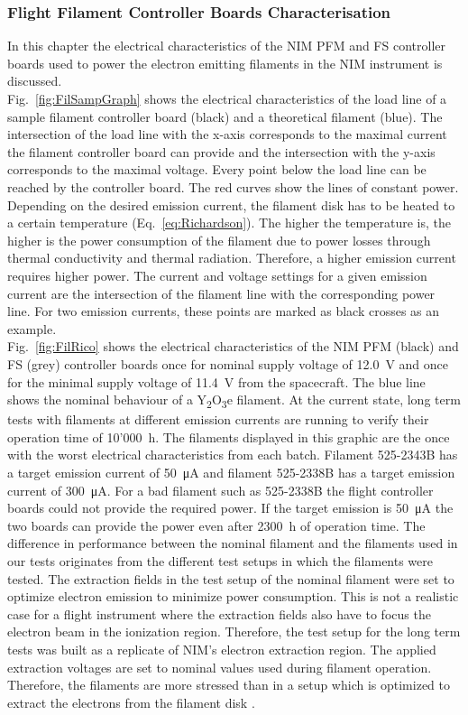 		\subsubsection{Flight Filament Controller Boards Characterisation}
		In this chapter the electrical characteristics of the NIM PFM and FS controller boards used to power the electron emitting filaments in the NIM instrument is discussed.\\
		Fig.~\ref{fig:FilSampGraph} shows the electrical characteristics of the load line of a sample filament controller board (black) and a theoretical filament (blue). The intersection of the load line with the x-axis corresponds to the maximal current the filament controller board can provide and the intersection with the y-axis corresponds to the maximal voltage. Every point below the load line can be reached by the controller board. The red curves show the lines of constant power. Depending on the desired emission current, the filament disk has to be heated to a certain temperature (Eq.~\eqref{eq:Richardson}). The higher the temperature is, the higher is the power consumption of the filament due to power losses through thermal conductivity and thermal radiation.	Therefore, a higher emission current requires higher power. The current and voltage settings for a given emission current are the intersection of the filament line with the corresponding power line. For two emission currents, these points are marked as black crosses as an example.\\
		Fig.~\ref{fig:FilRico} shows the electrical characteristics of the NIM PFM (black) and FS (grey) controller boards once for nominal supply voltage of 12.0~V and once for the minimal supply voltage of 11.4~V from the spacecraft. The blue line shows the nominal behaviour of a Y\textsubscript{2}O\textsubscript{3}e filament. At the current state, long term tests with filaments at different emission currents are running to verify their operation time of 10'000~h. The filaments displayed in this graphic are the once with the worst electrical characteristics from each batch. Filament 525-2343B has a target emission current of 50~\si{\micro\ampere} and filament 525-2338B has a target emission current of 300~\si{\micro\ampere}. For a bad filament such as 525-2338B the flight controller boards could not provide the required power. If the target emission is 50~\si{\micro\ampere} the two boards can provide the power even after 2300~h of operation time. The difference in performance between the nominal filament and the filaments used in our tests originates from the different test setups in which the filaments were tested. The extraction fields in the test setup of the nominal filament were set to optimize electron emission to minimize power consumption. This is not a realistic case for a flight instrument where the extraction fields also have to focus the electron beam in the ionization region. Therefore, the test setup for the long term tests was built as a replicate of NIM's electron extraction region. The applied extraction voltages are set to nominal values used during filament operation. Therefore, the filaments are more stressed than in a setup which is optimized to extract the electrons from the filament disk \cite{Diss_Fausch}.
		
